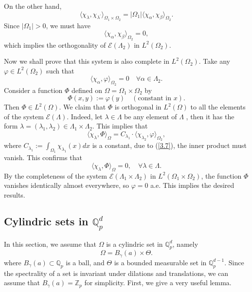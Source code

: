 \documentclass[a4paper,12pt]{amsart}
\def\Z{\mathbb{Z}}
\def\Q{\mathbb{Q}}
\begin{document}
On the other hand,
$$\langle \chi_\lambda, \chi_{\lambda^{\prime}}\rangle_{\Omega_1\times\Omega_2}
=|\Omega_1|\langle \chi_\alpha, \chi_\beta\rangle_{\Omega_2}.$$
Since $|\Omega_1|>0$, we must have
$$
\langle \chi_\alpha, \chi_\beta\rangle_{\Omega_2}=0,
$$
which implies the orthogonality of $\mathcal{E}(\Lambda_2)$ in $L^2(\Omega_2)$.

Now we shall prove that this system is also complete in $L^2(\Omega_2)$. Take any
$\varphi\in L^2(\Omega_2)$ such that
\begin{equation}\label{3.7}
\langle \chi_\alpha, \varphi\rangle_{\Omega_2}=0 \quad \forall \alpha\in \Lambda_2.
\end{equation}
Consider a function $\Phi$ defined on $\Omega=\Omega_1\times\Omega_2$ by
$$
\Phi(x,y):=\varphi(y)\quad (\text{constant in }x).
$$
Then $\Phi\in L^2(\Omega)$. We claim that $\Phi$ is orthogonal in $L^2(\Omega)$ to all the elements of
the system $\mathcal{E}(\Lambda)$.
Indeed, let  $\lambda\in\Lambda$ be any element of $\Lambda$ , then it has the form
$\lambda=(\lambda_1, \lambda_2)\in \Lambda_1\times\Lambda_2$. This implies that
\begin{equation}\label{3.8}
\langle \chi_\lambda, \Phi\rangle_{\Omega}= C_{\lambda_1}
\cdot\langle \chi_{\lambda_2}, \varphi\rangle_{\Omega_2},
\end{equation}
where $C_{\lambda_1}:=\int_{\Omega_1}\chi_{\lambda_1}(x) dx$ is a constant, due to (\ref{3.7}),
the inner product must vanish. This confirms that
$$
 \langle \chi_\lambda, \Phi\rangle_{\Omega}=0, \quad \forall \lambda\in\Lambda.
$$
By the completeness of the system $\mathcal{E}(\Lambda_1\times\Lambda_2)$ in $L^2(\Omega_1\times\Omega_2)$,
the function $\Phi$ vanishes identically almost everywhere, so $\varphi=0$ a.e. This implies the desired results.



\subsection{Cylindric sets in $\Q_p^d$}

In this section, we assume that $\Omega$ is a cylindric set in $\Q_p^d$, namely
\begin{equation}\label{cylindric set}
    \Omega=B_{\gamma}(a)\times\Theta.
\end{equation}
where $B_{\gamma}(a)\subset\Q_p$ is a ball, and $\Theta$ is a bounded measurable set in $\Q_p^{d-1}$.
Since the spectrality of a set is invariant under dilations and translations, we can assume that
$B_{\gamma}(a)=\Z_p$ for simplicity. First, we give a very useful lemma.
\end{document}
